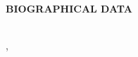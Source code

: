 \begin{doublespace}
	\thispagestyle{empty}

	\begin{center}
		\textbf{BIOGRAPHICAL DATA}
	\end{center}
	\leavevmode\\

	\justify
	\textbf{},

	\parx

	\parx
\end{doublespace}
